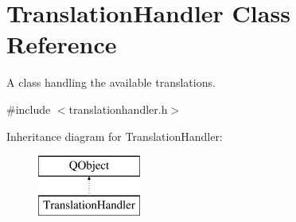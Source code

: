 \hypertarget{class_translation_handler}{\section{Translation\-Handler Class Reference}
\label{class_translation_handler}
}


A class handling the available translations.  




{\ttfamily \#include $<$translationhandler.\-h$>$}

Inheritance diagram for Translation\-Handler\-:\begin{figure}[H]
\begin{center}
\leavevmode
\includegraphics[height=2.000000cm]{class_translation_handler}
\end{center}
\end{figure}
